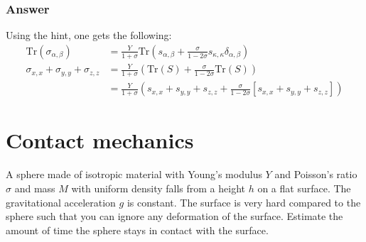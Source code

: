\documentclass{article}
\newcommand{\trace}{\text{Tr}}
\begin{document}
\subsubsection*{Answer}
Using the hint, one gets the following:
\begin{align*}
    \trace\left(\sigma_{\alpha, \beta}\right) &= \frac{Y}{1+\sigma}\trace\left(s_{\alpha,\beta} + \frac{\sigma}{1-2\sigma}s_{\kappa, \kappa}\delta_{\alpha,\beta}\right)\\
    \sigma_{x,x} + \sigma_{y,y} + \sigma_{z,z} &= \frac{Y}{1+\sigma}\left(\trace(S) + \frac{\sigma}{1-2\sigma}\trace(S)\right)\\
    &=\frac{Y}{1+\sigma}\left(s_{x,x} + s_{y,y} + s_{z,z} + \frac{\sigma}{1-2\sigma}\left[s_{x,x} + s_{y,y} + s_{z,z}\right]\right)
\end{align*}




\section*{Contact mechanics}
A sphere made of isotropic material with Young's modulus $Y$ and Poisson's ratio $\sigma$ and mass $M$ with uniform density falls from a height $h$ on a flat surface.
The gravitational acceleration $g$ is constant. The surface is very hard compared to the sphere such that you can ignore any deformation of the surface. Estimate the amount of time the sphere stays in contact with the surface.
\end{document}
